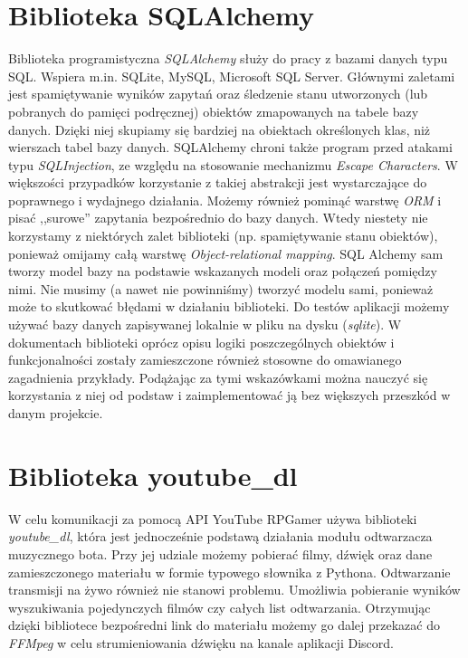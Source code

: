 \documentclass[shortabstract,inz]{iithesis}
\begin{document}
		\section{Biblioteka SQLAlchemy}
			Biblioteka programistyczna \textit{SQLAlchemy}\cite{sqlalchemydocs} służy do pracy z bazami danych typu SQL. Wspiera m.in. SQLite, MySQL, Microsoft SQL Server. Głównymi zaletami jest spamiętywanie wyników zapytań oraz śledzenie stanu utworzonych (lub pobranych do pamięci podręcznej) obiektów zmapowanych na tabele bazy danych. Dzięki niej skupiamy się bardziej na obiektach określonych klas, niż wierszach tabel bazy danych. SQLAlchemy chroni także program przed atakami typu \textit{SQLInjection}\cite{sqlinjection}, ze względu na stosowanie mechanizmu \textit{Escape Characters}\cite{escchars}. W większości przypadków korzystanie z takiej abstrakcji jest wystarczające do poprawnego i wydajnego działania. Możemy również pominąć warstwę \textit{ORM}\cite{wikiorm} i pisać ,,surowe'' zapytania bezpośrednio do bazy danych. Wtedy niestety nie korzystamy z niektórych zalet biblioteki (np. spamiętywanie stanu obiektów), ponieważ omijamy całą warstwę \textit{Object-relational mapping}. SQL Alchemy sam tworzy model bazy na podstawie wskazanych modeli oraz połączeń pomiędzy nimi. Nie musimy (a nawet nie powinniśmy) tworzyć modelu sami, ponieważ może to skutkować błędami w działaniu biblioteki. Do testów aplikacji możemy używać bazy danych zapisywanej lokalnie w pliku na dysku (\textit{sqlite}\cite{sqlite}). W dokumentach biblioteki oprócz opisu logiki poszczególnych obiektów i funkcjonalności zostały zamieszczone również stosowne do omawianego zagadnienia przykłady. Podążając za tymi wskazówkami można nauczyć się korzystania z niej od podstaw i zaimplementować ją bez większych przeszkód w danym projekcie.
		\section{Biblioteka youtube\_dl}
			W celu komunikacji za pomocą API YouTube RPGamer używa biblioteki \textit{youtube\_dl}\cite{youtubedl}, która  jest jednocześnie podstawą działania modułu odtwarzacza muzycznego bota. Przy jej udziale możemy pobierać filmy, dźwięk oraz dane zamieszczonego materiału w formie typowego słownika z Pythona. Odtwarzanie transmisji na żywo również nie stanowi problemu. Umożliwia pobieranie wyników wyszukiwania pojedynczych filmów czy całych list odtwarzania. Otrzymując dzięki bibliotece bezpośredni link do materiału możemy go dalej przekazać do \textit{FFMpeg}\cite{ffmpeg} w celu strumieniowania dźwięku na kanale aplikacji Discord. 
	
\end{document}

